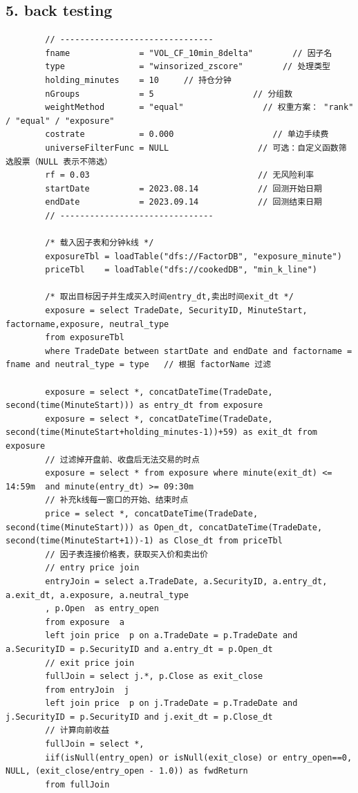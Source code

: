 \documentclass[10pt,a4paper]{article}
\begin{document}
	\subsection*{5. back testing}
	\begin{lstlisting}
		// -------------------------------
		fname              = "VOL_CF_10min_8delta"        // 因子名
		type               = "winsorized_zscore"        // 处理类型
		holding_minutes    = 10     // 持仓分钟
		nGroups            = 5                    // 分组数
		weightMethod       = "equal"                // 权重方案： "rank" / "equal" / "exposure"
		costrate           = 0.000                    // 单边手续费
		universeFilterFunc = NULL                  // 可选：自定义函数筛选股票（NULL 表示不筛选）
		rf = 0.03                                  // 无风险利率
		startDate          = 2023.08.14            // 回测开始日期
		endDate            = 2023.09.14            // 回测结束日期
		// -------------------------------
		
		/* 载入因子表和分钟k线 */
		exposureTbl = loadTable("dfs://FactorDB", "exposure_minute")   
		priceTbl    = loadTable("dfs://cookedDB", "min_k_line")
		
		/* 取出目标因子并生成买入时间entry_dt,卖出时间exit_dt */
		exposure = select TradeDate, SecurityID, MinuteStart, factorname,exposure, neutral_type 
		from exposureTbl 
		where TradeDate between startDate and endDate and factorname = fname and neutral_type = type   // 根据 factorName 过滤
		
		exposure = select *, concatDateTime(TradeDate, second(time(MinuteStart))) as entry_dt from exposure
		exposure = select *, concatDateTime(TradeDate, second(time(MinuteStart+holding_minutes-1))+59) as exit_dt from exposure
		// 过滤掉开盘前、收盘后无法交易的时点
		exposure = select * from exposure where minute(exit_dt) <= 14:59m  and minute(entry_dt) >= 09:30m
		// 补充k线每一窗口的开始、结束时点
		price = select *, concatDateTime(TradeDate, second(time(MinuteStart))) as Open_dt, concatDateTime(TradeDate, second(time(MinuteStart+1))-1) as Close_dt from priceTbl
		// 因子表连接价格表，获取买入价和卖出价
		// entry price join
		entryJoin = select a.TradeDate, a.SecurityID, a.entry_dt, a.exit_dt, a.exposure, a.neutral_type
		, p.Open  as entry_open
		from exposure  a
		left join price  p on a.TradeDate = p.TradeDate and a.SecurityID = p.SecurityID and a.entry_dt = p.Open_dt
		// exit price join
		fullJoin = select j.*, p.Close as exit_close
		from entryJoin  j
		left join price  p on j.TradeDate = p.TradeDate and j.SecurityID = p.SecurityID and j.exit_dt = p.Close_dt
		// 计算向前收益
		fullJoin = select *, 
		iif(isNull(entry_open) or isNull(exit_close) or entry_open==0, NULL, (exit_close/entry_open - 1.0)) as fwdReturn
		from fullJoin
		

\end{lstlisting}
\end{document}
